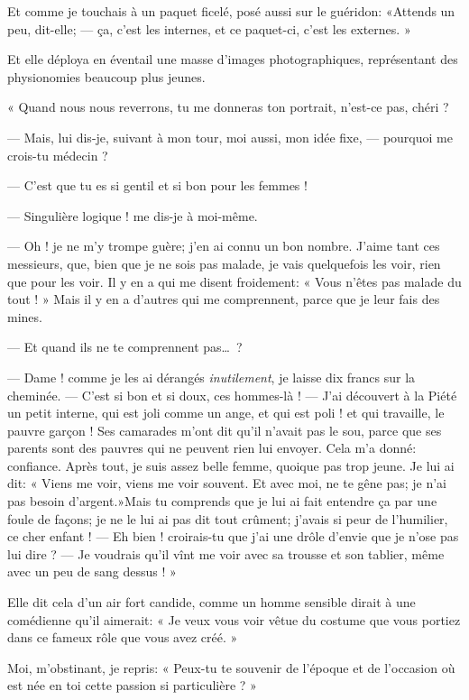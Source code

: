 Et comme je touchais à un paquet ficelé, posé aussi sur le guéridon:
«Attends un peu, dit{}-elle; --- ça, c’est les internes,
et ce paquet{}-ci, c’est les externes. »

Et elle déploya en éventail une masse d’images
photographiques, représentant des physionomies beaucoup plus jeunes.

« Quand nous nous reverrons, tu me donneras ton portrait,
n’est{}-ce pas, chéri ?

--- Mais, lui dis{}-je, suivant à mon tour, moi aussi, mon idée fixe, ---
pourquoi me crois{}-tu médecin ?

--- C’est que tu es si gentil et si bon pour les femmes !

--- Singulière logique ! me dis{}-je à moi{}-même.

--- Oh ! je ne m’y trompe guère; j’en ai
connu un bon nombre. J’aime tant ces messieurs, que,
bien que je ne sois pas malade, je vais quelquefois les voir, rien que
pour les voir. Il y en a qui me disent froidement: « Vous
n’êtes pas malade du tout ! » Mais il y en a
d’autres qui me comprennent, parce que je leur fais
des mines.

--- Et quand ils ne te comprennent pas\ldots\ ?

--- Dame ! comme je les ai dérangés \textit{inutilement}, je laisse dix francs sur
la cheminée. --- C’est si bon et si doux, ces
hommes{}-là ! --- J’ai découvert à la Piété un petit
interne, qui est joli comme un ange, et qui est poli ! et qui
travaille, le pauvre garçon ! Ses camarades m’ont dit
qu’il n’avait pas le sou, parce que
ses parents sont des pauvres qui ne peuvent rien lui envoyer. Cela
m’a donné: confiance. Après tout, je suis assez belle
femme, quoique pas trop jeune. Je lui ai dit: « Viens me voir, viens me
voir souvent. Et avec moi, ne te gêne pas; je n’ai pas
besoin d’argent.»Mais tu comprends que je lui ai fait
entendre ça par une foule de façons; je ne le lui ai pas dit tout
crûment; j’avais si peur de
l’humilier, ce cher enfant ! --- Eh bien ! croirais{}-tu
que j’ai une drôle d’envie que je
n’ose pas lui dire ? --- Je voudrais
qu’il vînt me voir avec sa trousse et son tablier,
même avec un peu de sang dessus ! »

Elle dit cela d’un air fort candide, comme un homme
sensible dirait à une comédienne qu’il aimerait: « Je
veux vous voir vêtue du costume que vous portiez dans ce fameux rôle
que vous avez créé. »

Moi, m’obstinant, je repris: « Peux{}-tu te souvenir de
l’époque et de l’occasion où est née
en toi cette passion si particulière ? »

